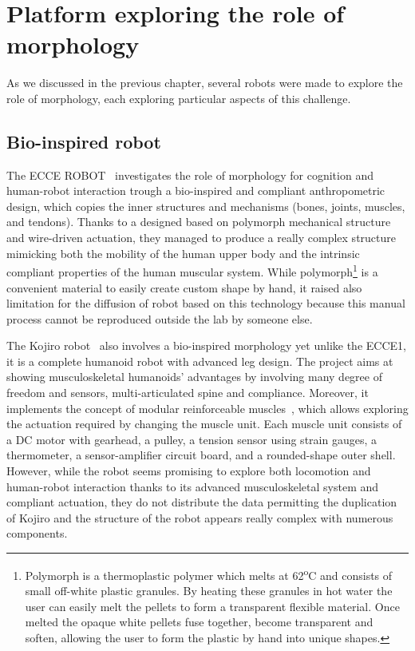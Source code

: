 \section{Platform exploring the role of morphology} %

As we discussed in the previous chapter, several robots were made to explore the role of morphology, each exploring particular aspects of this challenge.

\subsection{Bio-inspired robot} %
\label{sub:compliant_robot}

The ECCE ROBOT~\parencite{marques2010ecce1} investigates the role of morphology for cognition and human-robot interaction trough a bio-inspired and compliant anthropometric design, which copies the inner structures and mechanisms (bones, joints, muscles, and tendons). Thanks to a designed based on polymorph mechanical structure and wire-driven actuation, they managed to produce a really complex structure mimicking both the mobility of the human upper body and the intrinsic compliant properties of the human muscular system.
While polymorph\footnote{Polymorph is a thermoplastic polymer which melts at 62\textsuperscript{o}C and consists of small off-white plastic granules. By heating these granules in hot water the user can easily melt the pellets to form a transparent flexible material. Once melted the opaque white pellets fuse together, become transparent and soften, allowing the user to form the plastic by hand into unique shapes.} is a convenient material to easily create custom shape by hand, it raised also limitation for the diffusion of robot based on this technology because this manual process cannot be reproduced outside the lab by someone else.

The Kojiro robot~\parencite{mizuuchi2007advanced} also involves a bio-inspired morphology yet unlike the ECCE1, it is a complete humanoid robot with advanced leg design. The project aims at showing musculoskeletal humanoids’ advantages by involving many degree of freedom and sensors, multi-articulated spine and compliance. Moreover,
it implements the concept of modular reinforceable muscles~\cite{mizuuchi2004design}, which allows exploring the actuation required by changing the muscle unit. Each muscle unit consists of a DC motor with gearhead, a pulley, a tension sensor using strain gauges, a thermometer, a sensor-amplifier circuit board, and a rounded-shape outer shell.
However, while the robot seems promising to explore both locomotion and human-robot interaction thanks to its advanced musculoskeletal system and compliant actuation, they do not distribute the data permitting the duplication of Kojiro and the structure of the robot appears really complex with numerous components.

